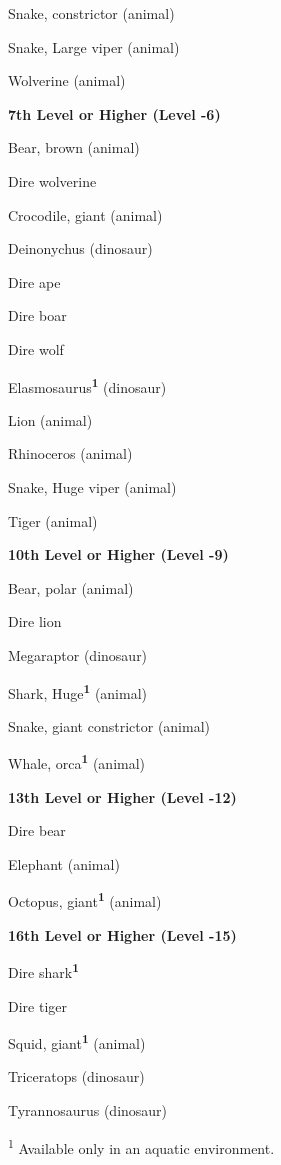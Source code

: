 \documentclass{article}
\begin{document}
Snake, constrictor (animal)

Snake, Large viper (animal)

Wolverine (animal)

\vspace{12pt}
\textbf{7th Level or Higher (Level -6)}

Bear, brown (animal) 

Dire wolverine

Crocodile, giant (animal) 

Deinonychus (dinosaur) 

Dire ape 

Dire boar 

Dire wolf 

Elasmosaurus\textsuperscript{\textbf{1}}\textbf{ }(dinosaur)

Lion (animal)

Rhinoceros (animal)

Snake, Huge viper (animal)

Tiger (animal)

\vspace{12pt}
\textbf{10th Level or Higher (Level -9)}

Bear, polar (animal) 

Dire lion 

Megaraptor (dinosaur) 

Shark, Huge\textsuperscript{\textbf{1}}\textbf{ }(animal)

Snake, giant constrictor (animal)

Whale, orca\textsuperscript{\textbf{1}}\textbf{ }(animal)

\vspace{12pt}
\textbf{13th Level or Higher (Level -12)}

Dire bear 

Elephant (animal)

Octopus, giant\textsuperscript{\textbf{1}}\textbf{ }(animal)

\vspace{12pt}
\textbf{16th Level or Higher (Level -15)}

Dire shark\textsuperscript{\textbf{1}}\textbf{ }

Dire tiger 

Squid, giant\textsuperscript{\textbf{1}}\textbf{ }(animal)

Triceratops (dinosaur)

Tyrannosaurus (dinosaur)

\vspace{12pt}
\textsuperscript{1} Available only in an aquatic environment.
\end{document}
